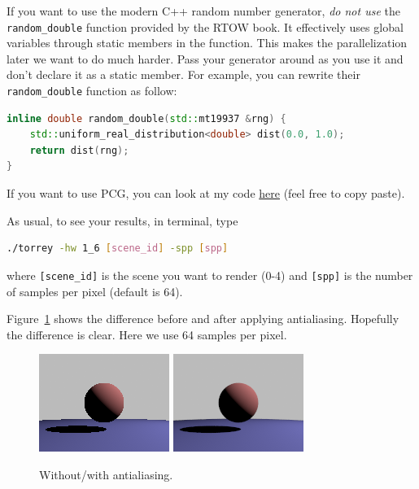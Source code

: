 If you want to use the modern C++ random number generator, \emph{do not use} the \lstinline{random_double} function provided by the RTOW book. It effectively uses global variables through static members in the function. This makes the parallelization later we want to do much harder. Pass your generator around as you use it and don't declare it as a static member. For example, you can rewrite their \lstinline{random_double} function as follow:
\begin{lstlisting}[language=C++]
inline double random_double(std::mt19937 &rng) {
    std::uniform_real_distribution<double> dist(0.0, 1.0);
    return dist(rng);
}
\end{lstlisting}
If you want to use PCG, you can look at my code \href{https://github.com/BachiLi/lajolla_public/src/pcg.h}{here} (feel free to copy paste).

As usual, to see your results, in terminal, type
\begin{lstlisting}[language=bash]
  ./torrey -hw 1_6 [scene_id] -spp [spp]
\end{lstlisting}
where \lstinline{[scene_id]} is the scene you want to render (0-4) and \lstinline{[spp]} is the number of samples per pixel (default is 64).

Figure~\ref{fig:hw_1_6} shows the difference before and after applying antialiasing. Hopefully the difference is clear. Here we use 64 samples per pixel.

\begin{figure}[ht]
    \centering
    \includegraphics[width=0.4\linewidth]{imgs/hw_1_6_before.png}
    \includegraphics[width=0.4\linewidth]{imgs/hw_1_6_after.png}
    \caption{Without/with antialiasing.}
    \label{fig:hw_1_6}
\end{figure}

